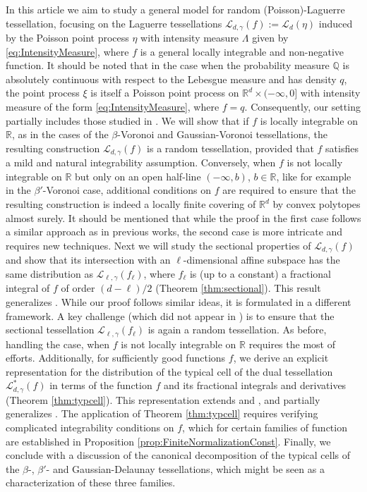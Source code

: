 \documentclass[11pt,a4paper]{article}
\theoremstyle{plain}
\theoremstyle{definition}
\theoremstyle{remark}
\def\QQ{\mathbb{Q}}
\def\RR{\mathbb{R}}
\def\cL{\mathcal{L}}
\begin{document}
In this article we aim to study a general model for random (Poisson)-Laguerre tessellation, focusing on the Laguerre tessellations $\cL_{d,\gamma}(f):=\cL_d(\eta)$ induced by the Poisson point process $\eta$ with intensity measure $\Lambda$ given by \eqref{eq:IntensityMeasure}, where $f$ is a general locally integrable and non-negative function. It should be noted that in the case when the probability measure $\QQ$ is absolutely continuous with respect to the Lebesgue measure and has density $q$, the point process $\xi$ is itself a Poisson point process on $\RR^d\times (-\infty,0]$ with intensity measure of the form \eqref{eq:IntensityMeasure}, where $f=q$. Consequently, our setting partially includes those studied in \cite{Ldoc, LZ08}. We will show that if $f$ is locally integrable on $\RR$, as in the cases of the $\beta$-Voronoi and Gaussian-Voronoi tessellations, the resulting construction $\cL_{d,\gamma}(f)$ is a random tessellation, provided that $f$ satisfies a mild and natural integrability assumption. Conversely, when $f$ is not locally integrable on $\RR$ but only on an open half-line $(-\infty, b)$, $b\in\RR$, like for example in the $\beta'$-Voronoi case, additional conditions on $f$ are required to ensure that the resulting construction is indeed a locally finite covering of $\RR^d$ by convex polytopes almost surely. It should be mentioned that while the proof in the first case follows a similar approach as in previous works, the second case is more intricate and requires new techniques. Next we will study the sectional properties of $\cL_{d,\gamma}(f)$ and show that its intersection with an $\ell$-dimensional affine subspace has the same distribution as $\cL_{\ell,\gamma}(f_{\ell})$, where $f_{\ell}$ is (up to a constant) a fractional integral of $f$ of order $(d-\ell)/2$ (Theorem \ref{thm:sectional}). This result generalizes \cite[Theorem 4.1]{sectional}. While our proof follows similar ideas, it is formulated in a different framework. A key challenge (which did not appear in \cite[Theorem 4.1]{sectional}) is to ensure that the sectional tessellation $\cL_{\ell,\gamma}(f_{\ell})$ is again a random tessellation. As before, handling the case, when $f$ is not locally integrable on $\RR$ requires 
the most of efforts. Additionally, for sufficiently good functions $f$, we derive an explicit representation for the distribution of the typical cell of the dual tessellation $\cL^*_{d,\gamma}(f)$ in terms of the function $f$ and its fractional integrals and derivatives (Theorem \ref{thm:typcell}). This representation extends \cite[Theorem 4.5]{GKT20} and \cite[Theorem 5.1]{GKT21}, and partially generalizes \cite[Theorem 3.3.1]{Ldoc}. The application of Theorem \ref{thm:typcell} requires verifying complicated integrability conditions on $f$, which for certain families of function are established in Proposition \ref{prop:FiniteNormalizationConst}. 
Finally, we conclude with a discussion of the canonical decomposition of the typical cells of the $\beta$-, $\beta'$- and Gaussian-Delaunay tessellations, which might be seen as a characterization of these three families. 
\end{document}
